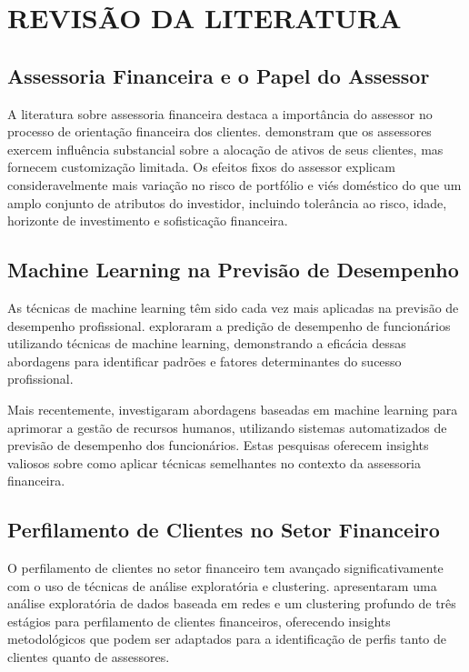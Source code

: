 \chapter{REVISÃO DA LITERATURA}

\section{Assessoria Financeira e o Papel do Assessor}

A literatura sobre assessoria financeira destaca a importância do assessor no processo de orientação financeira dos clientes. \cite{foerster2017} demonstram que os assessores exercem influência substancial sobre a alocação de ativos de seus clientes, mas fornecem customização limitada. Os efeitos fixos do assessor explicam consideravelmente mais variação no risco de portfólio e viés doméstico do que um amplo conjunto de atributos do investidor, incluindo tolerância ao risco, idade, horizonte de investimento e sofisticação financeira.

\section{Machine Learning na Previsão de Desempenho}

As técnicas de machine learning têm sido cada vez mais aplicadas na previsão de desempenho profissional. \cite{lather2020} exploraram a predição de desempenho de funcionários utilizando técnicas de machine learning, demonstrando a eficácia dessas abordagens para identificar padrões e fatores determinantes do sucesso profissional.

Mais recentemente, \cite{uppal2024} investigaram abordagens baseadas em machine learning para aprimorar a gestão de recursos humanos, utilizando sistemas automatizados de previsão de desempenho dos funcionários. Estas pesquisas oferecem insights valiosos sobre como aplicar técnicas semelhantes no contexto da assessoria financeira.

\section{Perfilamento de Clientes no Setor Financeiro}

O perfilamento de clientes no setor financeiro tem avançado significativamente com o uso de técnicas de análise exploratória e clustering. \cite{choi2024} apresentaram uma análise exploratória de dados baseada em redes e um clustering profundo de três estágios para perfilamento de clientes financeiros, oferecendo insights metodológicos que podem ser adaptados para a identificação de perfis tanto de clientes quanto de assessores.


